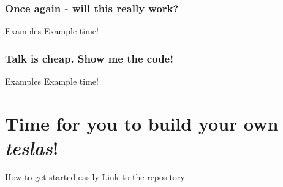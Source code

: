 \documentclass[aspectratio=1610,english]{beamer} %
\begin{document}
 \section{Once again - will this really work?}
  	\begin{frame}{Examples}
		Example time!
	\end{frame}
  	
  	\section{Talk is cheap. Show me the code!}
	\begin{frame}{Examples}
	Example time!
	\end{frame}
	
	
\part{Time for you to build your own \textit{teslas}!}
	\begin{frame}{How to get started easily}
	Link to the repository
	\end{frame}
\end{document}

